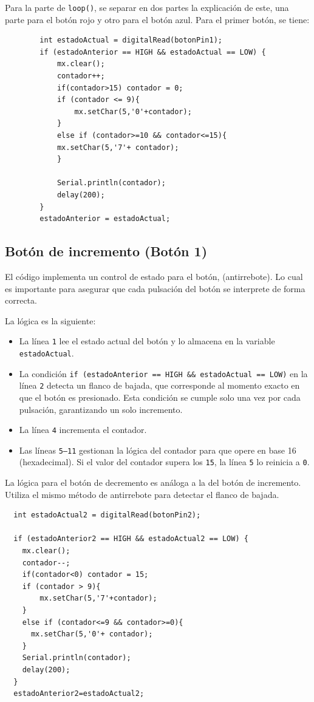 \clearpage
Para la parte de \texttt{loop()}, se separar en dos partes la explicación de este, una parte para el botón rojo y otro para el botón azul. Para el primer botón, se tiene:

\begin{verbatim}
        int estadoActual = digitalRead(botonPin1);
        if (estadoAnterior == HIGH && estadoActual == LOW) {
            mx.clear();
            contador++;
            if(contador>15) contador = 0;
            if (contador <= 9){
                mx.setChar(5,'0'+contador);
            }
            else if (contador>=10 && contador<=15){
            mx.setChar(5,'7'+ contador);
            }
    
            Serial.println(contador);
            delay(200); 
        }
        estadoAnterior = estadoActual; 
    \end{verbatim}

\subsection*{Botón de incremento (Botón 1)}
El código implementa un control de estado para el botón, (antirrebote). Lo cual es importante para asegurar que cada pulsación del botón se interprete de forma correcta.

La lógica es la siguiente:
\begin{itemize}
    \item La línea \texttt{1} lee el estado actual del botón y lo almacena en la variable \texttt{estadoActual}.
    \item La condición \texttt{if (estadoAnterior == HIGH \&\& estadoActual == LOW)} en la línea \texttt{2} detecta un flanco de bajada, que corresponde al momento exacto en que el botón es presionado. Esta condición se cumple solo una vez por cada pulsación, garantizando un solo incremento.
    \item La línea \texttt{4} incrementa el contador.
    \item Las líneas \texttt{5--11} gestionan la lógica del contador para que opere en base 16 (hexadecimal). Si el valor del contador supera los \texttt{15}, la línea \texttt{5} lo reinicia a \texttt{0}.
\end{itemize}

La lógica para el botón de decremento es análoga a la del botón de incremento. Utiliza el mismo método de antirrebote para detectar el flanco de bajada.
\clearpage
\begin{listing}[H]
    \begin{verbatim}
  int estadoActual2 = digitalRead(botonPin2);
 
  if (estadoAnterior2 == HIGH && estadoActual2 == LOW) {
    mx.clear();
    contador--;
    if(contador<0) contador = 15;
    if (contador > 9){
        mx.setChar(5,'7'+contador);
    }
    else if (contador<=9 && contador>=0){
      mx.setChar(5,'0'+ contador);
    }
    Serial.println(contador);
    delay(200); 
  }
  estadoAnterior2=estadoActual2;
    \end{verbatim}
\end{listing}

